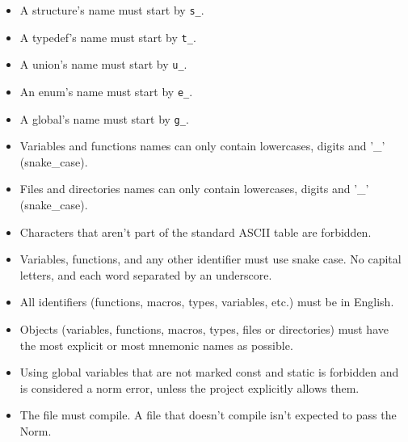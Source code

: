 \documentclass{42-en}
\begin{document}
        \begin{itemize}

            \item A structure's name must start by
                \texttt{s\_}.

            \item A typedef's name must start by
                \texttt{t\_}.

            \item A union's name must start by \texttt{u\_}.

            \item An enum's name must start by \texttt{e\_}.

            \item A global's name must start by \texttt{g\_}.

            \item Variables and functions names can only contain lowercases, digits and
                '\_' (snake\_case).

            \item Files and directories names can only contain lowercases, digits and
                '\_' (snake\_case).

            \item Characters that aren't part of the standard
                ASCII table are forbidden.

            \item Variables, functions, and any other identifier must use
                snake case. No capital letters, and each word separated by an
                underscore.

            \item All identifiers (functions, macros, types,
                variables, etc.) must be in English.

            \item Objects (variables, functions, macros, types,
                files or directories) must have the most
                explicit or most mnemonic names as possible.

            \item Using global variables that are not marked const and static is
            forbidden and is considered a norm error, unless the project explicitly allows them.

            \item The file must compile. A file that doesn't compile isn't expected
                to pass the Norm.
        \end{itemize}
\newpage
\end{document}
